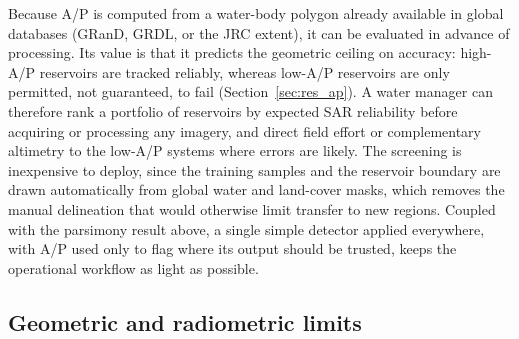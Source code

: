 Because A/P is computed from a water-body polygon already available in global
databases (GRanD, GRDL, or the JRC extent), it can be evaluated in advance of
processing. Its value is that it predicts the geometric ceiling on accuracy:
high-A/P reservoirs are tracked reliably, whereas low-A/P reservoirs are only
permitted, not guaranteed, to fail (Section~\ref{sec:res_ap}). A water manager
can therefore rank a portfolio of reservoirs by expected SAR reliability before
acquiring or processing any imagery, and direct field effort or complementary
altimetry to the low-A/P systems where errors are likely. The screening is
inexpensive to deploy, since the training samples and the reservoir boundary are
drawn automatically from global water and land-cover masks, which removes the
manual delineation that would otherwise limit transfer to new regions. Coupled
with the parsimony result above, a single simple detector applied everywhere,
with A/P used only to flag where its output should be trusted, keeps the
operational workflow as light as possible.

\subsection{Geometric and radiometric limits}
\label{sec:disc_geo_radio}

